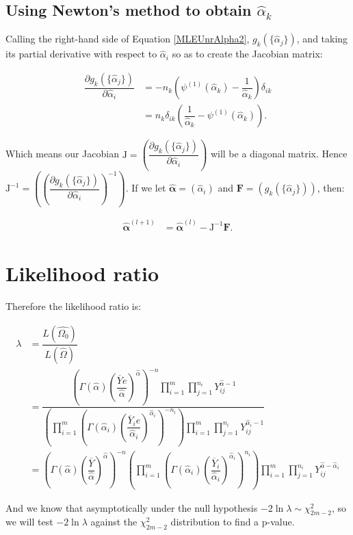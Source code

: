 \documentclass[12pt,a4paper]{article}
\newcommand{\eqn}[1]{Equation \ref{#1}}
\newcommand{\ovY}{\overline{Y}}
\newcommand{\wal}{\widehat{\alpha}}
\begin{document}
	\subsection{Using Newton's method to obtain $\wal_k$}
	Calling the right-hand side of \eqn{MLEUnrAlpha2}, $g_k(\{\wal_j\})$, and taking its partial derivative with respect to $\wal_i$ so as to create the Jacobian matrix:
	
	\begin{align*}
		\dfrac{\partial g_k(\{\wal_j\})}{\partial \wal_i} &= -n_k \left(\psi^{(1)}(\wal_k) - \dfrac{1}{\wal_k}\right)\delta_{ik} \\
		&= n_k \delta_{ik} \left(\dfrac{1}{\wal_k} - \psi^{(1)}(\wal_k)\right).
	\end{align*}

	Which means our Jacobian $\mathrm{J}=\left(\dfrac{\partial g_k(\{\wal_j\})}{\partial \wal_i}\right)$ will be a diagonal matrix. Hence $\mathrm{J}^{-1} = \left(\left(\dfrac{\partial g_k(\{\wal_j\})}{\partial \wal_i}\right)^{-1}\right)$. If we let $\boldsymbol{\wal} = (\wal_i)$ and $\mathbf{F} = (g_k(\{\wal_j\}))$, then:
	
	\begin{align*}
		\boldsymbol{\wal}^{(l+1)} &= \boldsymbol{\wal}^{(l)} - \mathrm{J}^{-1}\mathbf{F}.
	\end{align*}

	\section{Likelihood ratio}
	Therefore the likelihood ratio is:
	
	\begin{align*}
		\lambda &= \dfrac{L(\widehat{\Omega_0})}{L(\widehat{\Omega})} \\
		&= \dfrac{\left(\Gamma(\wal)\left(\dfrac{\ovY e}{\wal}\right)^{\wal}\right)^{-n} \prod_{i=1}^m \prod_{j=1}^{n_i} Y_{ij}^{\wal-1}}{\left(\prod_{i=1}^m\left(\Gamma(\wal_i)\left(\dfrac{\ovY_i e}{\wal_i}\right)^{\wal_i}\right)^{-n_i}\right) \prod_{i=1}^m \prod_{j=1}^{n_i} Y_{ij}^{\wal_i-1}} \\
		&= \left(\Gamma(\wal)\left(\dfrac{\ovY }{\wal}\right)^{\wal}\right)^{-n} \left(\prod_{i=1}^m\left(\Gamma(\wal_i)\left(\dfrac{\ovY_i }{\wal_i}\right)^{\wal_i}\right)^{n_i}\right)\prod_{i=1}^m \prod_{j=1}^{n_i} Y_{ij}^{\wal-\wal_i}
	\end{align*}

	And we know that asymptotically under the null hypothesis $-2\ln{\lambda} \sim \chi^2_{2m-2}$, so we will test $-2\ln{\lambda}$ against the $\chi^2_{2m-2}$ distribution to find a p-value.
\end{document}
